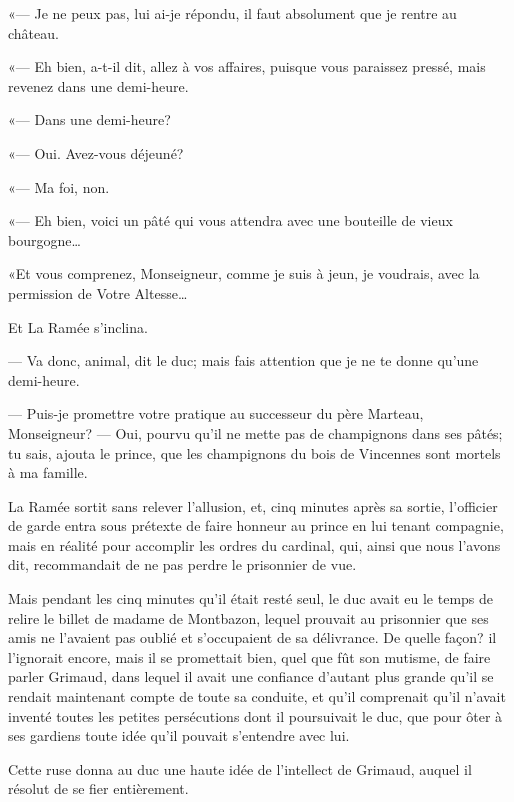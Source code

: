 «— Je ne peux pas, lui ai-je répondu, il faut absolument que je rentre au château.

«— Eh bien, a-t-il dit, allez à vos affaires, puisque vous paraissez pressé, mais revenez dans une demi-heure.

«— Dans une demi-heure?

«— Oui. Avez-vous déjeuné?

«— Ma foi, non.

«— Eh bien, voici un pâté qui vous attendra avec une bouteille de vieux bourgogne\dots

«Et vous comprenez, Monseigneur, comme je suis à jeun, je voudrais, avec la permission de Votre Altesse\dots

Et La Ramée s'inclina.

— Va donc, animal, dit le duc; mais fais attention que je ne te donne qu'une demi-heure.

— Puis-je promettre votre pratique au successeur du père Marteau, Monseigneur?
— Oui, pourvu qu'il ne mette pas de champignons dans ses pâtés; tu sais, ajouta le prince, que les champignons du bois de Vincennes sont mortels à ma famille.

La Ramée sortit sans relever l'allusion, et, cinq minutes après sa sortie, l'officier de garde entra sous prétexte de faire honneur au prince en lui tenant compagnie, mais en réalité pour accomplir les ordres du cardinal, qui, ainsi que nous l'avons dit, recommandait de ne pas perdre le prisonnier de vue.

Mais pendant les cinq minutes qu'il était resté seul, le duc avait eu le temps de relire le billet de madame de Montbazon, lequel prouvait au prisonnier que ses amis ne l'avaient pas oublié et s'occupaient de sa délivrance. De quelle façon? il l'ignorait encore, mais il se promettait bien, quel que fût son mutisme, de faire parler Grimaud, dans lequel il avait une confiance d'autant plus grande qu'il se rendait maintenant compte de toute sa conduite, et qu'il comprenait qu'il n'avait inventé toutes les petites persécutions dont il poursuivait le duc, que pour ôter à ses gardiens toute idée qu'il pouvait s'entendre avec lui.

Cette ruse donna au duc une haute idée de l'intellect de Grimaud, auquel il résolut de se fier entièrement.